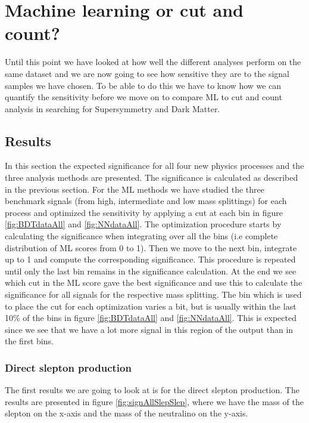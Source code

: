 \chapter{Machine learning or cut and count?}
\label{sec:results}
Until this point we have looked at how well the different analyses perform on the same dataset and we are now going to see how sensitive they are to the signal samples we have chosen. To be able to do this we have to know how we can quantify the sensitivity before we move on to compare ML to cut and count analysis in searching for Supersymmetry and Dark Matter. 
%
%

%





\section{Results}
In this section the expected significance for all four new physics processes and the three analysis methods are presented. The significance is calculated as described in the previous section. For the ML methods we have studied the three benchmark signals (from high, intermediate and low mass splittings) for each process and optimized the sensitivity by applying a cut at each bin in figure \ref{fig:BDTdataAll} and \ref{fig:NNdataAll}. The optimization procedure starts by calculating the significance when integrating over all the bins (i.e complete distribution of ML scores from 0 to 1). Then we move to the next bin, integrate up to 1 and compute the corresponding significance. This procedure is repeated until only the last bin remains in the significance calculation. At the end we see which cut in the ML score gave the best significance and use this to calculate the significance for all signals for the respective mass splitting. The bin which is used to place the cut for each optimization varies a bit, but is usually within the last 10\% of the bins in figure \ref{fig:BDTdataAll} and \ref{fig:NNdataAll}. This is expected since we see that we have a lot more signal in this region of the output than in the first bins. 

\subsection{Direct slepton production}
\label{sec:resSlepSlep}
The first results we are going to look at is for the direct slepton production. The results are presented in figure \ref{fig:signAllSlepSlep}, where we have the mass of the slepton on the x-axis and the mass of the neutralino on the y-axis. 

